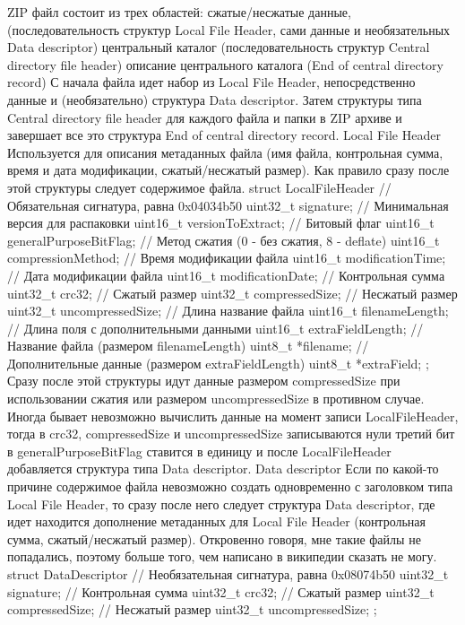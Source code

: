 ZIP файл состоит из трех областей:
сжатые/несжатые данные, (последовательность структур Local File Header, сами данные и необязательных Data descriptor)
центральный каталог (последовательность структур Central directory file header)
описание центрального каталога (End of central directory record)
С начала файла идет набор из Local File Header, непосредственно данные и (необязательно) структура Data descriptor. Затем структуры типа Central directory file header для каждого файла и папки в ZIP архиве и завершает все это структура End of central directory record.
Local File Header
Используется для описания метаданных файла (имя файла, контрольная сумма, время и дата модификации, сжатый/несжатый размер). Как правило сразу после этой структуры следует содержимое файла.
struct LocalFileHeader
{
    // Обязательная сигнатура, равна 0x04034b50
    uint32_t signature;
    // Минимальная версия для распаковки
    uint16_t versionToExtract;
    // Битовый флаг
    uint16_t generalPurposeBitFlag;
    // Метод сжатия (0 - без сжатия, 8 - deflate)
    uint16_t compressionMethod;
    // Время модификации файла
    uint16_t modificationTime;
    // Дата модификации файла
    uint16_t modificationDate;
    // Контрольная сумма
    uint32_t crc32;
    // Сжатый размер
    uint32_t compressedSize;
    // Несжатый размер
    uint32_t uncompressedSize;
    // Длина название файла
    uint16_t filenameLength;
    // Длина поля с дополнительными данными
    uint16_t extraFieldLength;
    // Название файла (размером filenameLength)
    uint8_t *filename;
    // Дополнительные данные (размером extraFieldLength)
    uint8_t *extraField;
};
Сразу после этой структуры идут данные размером compressedSize при использовании сжатия или размером uncompressedSize в противном случае.
Иногда бывает невозможно вычислить данные на момент записи LocalFileHeader, тогда в crc32, compressedSize и uncompressedSize записываются нули третий бит в generalPurposeBitFlag ставится в единицу и после LocalFileHeader добавляется структура типа Data descriptor.
Data descriptor
Если по какой-то причине содержимое файла невозможно создать одновременно с заголовком типа Local File Header, то сразу после него следует структура Data descriptor, где идет находится дополнение метаданных для Local File Header (контрольная сумма, сжатый/несжатый размер). Откровенно говоря, мне такие файлы не попадались, поэтому больше того, чем написано в википедии сказать не могу.
struct DataDescriptor
{
    // Необязательная сигнатура, равна 0x08074b50
    uint32_t signature;
    // Контрольная сумма
    uint32_t crc32;
    // Сжатый размер
    uint32_t compressedSize;
    // Несжатый размер
    uint32_t uncompressedSize;
};
